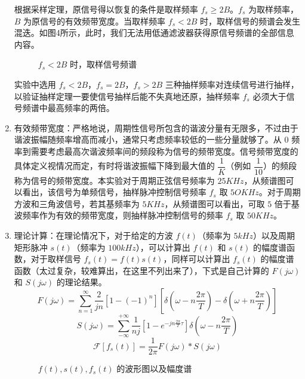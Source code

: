 \documentclass[dvipsnames, svgnames,a4paper,11pt]{article}
\begin{document}
\begin{enumerate}
  根据采样定理，原信号得以恢复的条件是取样频率 $f_s \ge 2B$。$f_s$ 为取样频率，$B$ 为原信号的有效频带宽度。当取样频率 $f_s < 2B$ 时，取样信号的频谱会发生混迭。如图4所示，此时，我们无法用低通滤波器获得原信号频谱的全部信息内容。
  
  \begin{figure}[htbp]
    \centering
    \caption{$f_s < 2B$ 时，取样信号频谱}
  \end{figure}

  实验中选用 $f_s<2B$，$f_s=2B$，$f_s > 2B$ 三种抽样频率对连续信号进行抽样，以验证抽样定理一要使信号抽样后能不失真地还原，抽样频率 $f_s$ 必须大于信号频谱中最高频率的两倍。

  \item 有效频带宽度：严格地说，周期性信号所包含的谐波分量有无限多，不过由于谐波振幅随频率增高而减小，通常只考虑频率较低的一些分量就够了。从 $0$ 频率到需要考虑最高次谐波频率间的频段称为信号的频带宽度。信号频带宽度的具体定义视情况而定，有时将谐波振幅下降到最大值的 $\dfrac{1}{K}$（例如 $\dfrac{1}{10}$）的频段称为信号的频带宽度。本实验对于周期正弦信号频率为 $25KHz$，从频谱图可以看出，该信号为单频信号，抽样脉冲控制信号频率 $f_s$ 取 $5OKHz$。对于周期方波和三角波信号，若其基频率为 $5KHz$，从频谱图可以看出，可取 $5$ 倍于基波频率作为有效的频带宽度，则抽样脉冲控制信号的频率 $f_s$ 取 $50KHz$。
  
  \item 理论计算：在理论情况下，对于给定的方波 $f(t)$（频率为 $5kHz$）以及周期矩形脉冲 $s(t)$（频率为 $100kHz$），可以计算出 $f(t)$ 和 $s(t)$ 的幅度谱函数，对于取样信号 $f_s(t) = f(t)s(t)$，同样可以计算出 $f_s(t)$ 的幅度谱函数（太过复杂，较难算出，在这里不列出来了），下式是自己计算的 $F(j\omega)$ 和 $S(j\omega)$ 的理论结果。
    \begin{equation}
      F(j\omega) = \sum_{n = 1}^{\infty}\dfrac{2}{jn}[1 - (-1)^n][\delta(\omega - n\dfrac{2\pi}{T}) - \delta(\omega + n\dfrac{2\pi}{T})]
    \end{equation}
    \begin{equation}
      S(j\omega) = \sum_{-\infty}^{+\infty}\dfrac{1}{nj}[1 - e^{-jn\frac{2\pi}{T}\tau}] \delta(\omega - n\dfrac{2\pi}{T})
    \end{equation}
    \begin{equation}
      \mathscr{F}[f_s(t)] = \dfrac{1}{2\pi}F(j\omega) * S(j\omega)
    \end{equation}
  \begin{figure}[htbp]
    \centering
    \caption{$f(t), s(t), f_s(t)$ 的波形图以及幅度谱}
  \end{figure}
\end{enumerate}
\end{document}
